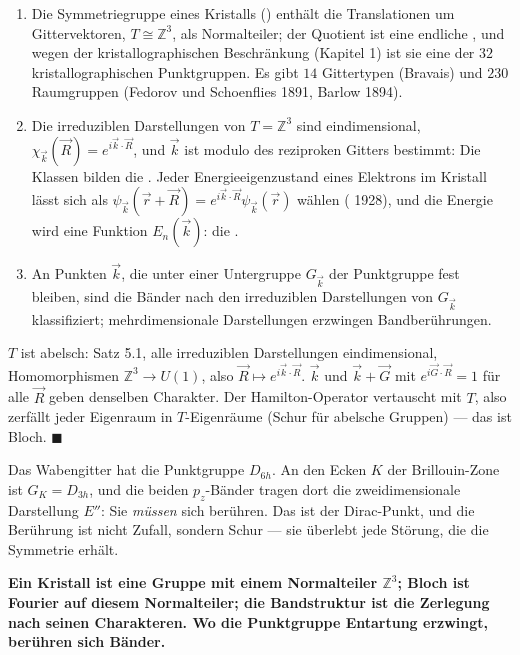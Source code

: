 \begin{merksatz}
\begin{enumerate}[label=(\alph*), leftmargin=1.6em]
\item Die Symmetriegruppe eines Kristalls () enthält die Translationen um Gittervektoren, $T\cong\mathbb Z^{3}$, als Normalteiler; der Quotient ist eine endliche , und wegen der kristallographischen Beschränkung (Kapitel 1) ist sie eine der $32$ kristallographischen Punktgruppen. Es gibt $14$ Gittertypen (Bravais) und $230$ Raumgruppen (Fedorov und Schoenflies 1891, Barlow 1894).
\item Die irreduziblen Darstellungen von $T = \mathbb Z^{3}$ sind eindimensional, $\chi_{\vec k}(\vec R) = e^{i\vec k\cdot\vec R}$, und $\vec k$ ist modulo des reziproken Gitters bestimmt: Die Klassen bilden die . Jeder Energieeigenzustand eines Elektrons im Kristall lässt sich als $\psi_{\vec k}(\vec r + \vec R) = e^{i\vec k\cdot\vec R}\psi_{\vec k}(\vec r)$ wählen ( 1928), und die Energie wird eine Funktion $E_n(\vec k)$: die .
\item An Punkten $\vec k$, die unter einer Untergruppe $G_{\vec k}$ der Punktgruppe fest bleiben, sind die Bänder nach den irreduziblen Darstellungen von $G_{\vec k}$ klassifiziert; mehrdimensionale Darstellungen erzwingen Bandberührungen.
\end{enumerate}

$T$ ist abelsch: Satz 5.1, alle irreduziblen Darstellungen eindimensional, Homomorphismen $\mathbb Z^{3}\to U(1)$, also $\vec R\mapsto e^{i\vec k\cdot\vec R}$. $\vec k$ und $\vec k + \vec G$ mit $e^{i\vec G\cdot\vec R} = 1$ für alle $\vec R$ geben denselben Charakter. Der Hamilton-Operator vertauscht mit $T$, also zerfällt jeder Eigenraum in $T$-Eigenräume (Schur für abelsche Gruppen) --- das ist Bloch. $\blacksquare$

Das Wabengitter hat die Punktgruppe $D_{6h}$. An den Ecken $K$ der Brillouin-Zone ist $G_K = D_{3h}$, und die beiden $p_z$-Bänder tragen dort die zweidimensionale Darstellung $E''$: Sie \emph{müssen} sich berühren. Das ist der Dirac-Punkt, und die Berührung ist nicht Zufall, sondern Schur --- sie überlebt jede Störung, die die Symmetrie erhält.

\begin{center}
\begin{minipage}{0.9\textwidth}
\textbf{Ein Kristall ist eine Gruppe mit einem Normalteiler $\mathbb Z^{3}$; Bloch ist Fourier auf diesem Normalteiler; die Bandstruktur ist die Zerlegung nach seinen Charakteren. Wo die Punktgruppe Entartung erzwingt, berühren sich Bänder.}
\end{minipage}
\end{center}
\end{merksatz}

